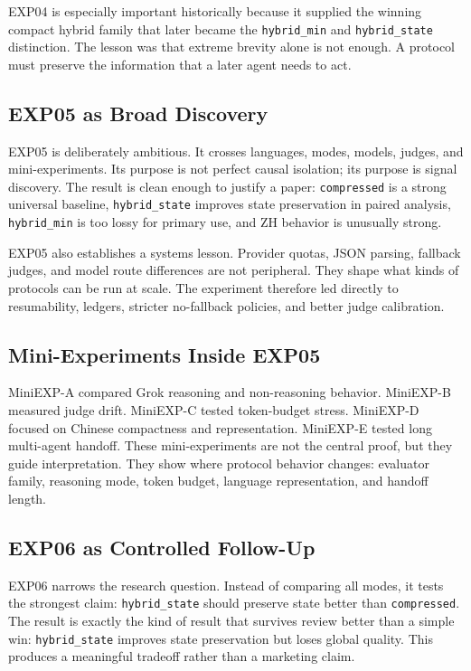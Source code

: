 \documentclass[11pt]{article}
\begin{document}
EXP04 is especially important historically because it supplied the winning compact hybrid family that later became the \texttt{hybrid\_min} and \texttt{hybrid\_state} distinction. The lesson was that extreme brevity alone is not enough. A protocol must preserve the information that a later agent needs to act.

\subsection{EXP05 as Broad Discovery}
EXP05 is deliberately ambitious. It crosses languages, modes, models, judges, and mini-experiments. Its purpose is not perfect causal isolation; its purpose is signal discovery. The result is clean enough to justify a paper: \texttt{compressed} is a strong universal baseline, \texttt{hybrid\_state} improves state preservation in paired analysis, \texttt{hybrid\_min} is too lossy for primary use, and ZH behavior is unusually strong.

EXP05 also establishes a systems lesson. Provider quotas, JSON parsing, fallback judges, and model route differences are not peripheral. They shape what kinds of protocols can be run at scale. The experiment therefore led directly to resumability, ledgers, stricter no-fallback policies, and better judge calibration.

\subsection{Mini-Experiments Inside EXP05}
MiniEXP-A compared Grok reasoning and non-reasoning behavior. MiniEXP-B measured judge drift. MiniEXP-C tested token-budget stress. MiniEXP-D focused on Chinese compactness and representation. MiniEXP-E tested long multi-agent handoff. These mini-experiments are not the central proof, but they guide interpretation. They show where protocol behavior changes: evaluator family, reasoning mode, token budget, language representation, and handoff length.

\subsection{EXP06 as Controlled Follow-Up}
EXP06 narrows the research question. Instead of comparing all modes, it tests the strongest claim: \texttt{hybrid\_state} should preserve state better than \texttt{compressed}. The result is exactly the kind of result that survives review better than a simple win: \texttt{hybrid\_state} improves state preservation but loses global quality. This produces a meaningful tradeoff rather than a marketing claim.
\end{document}
